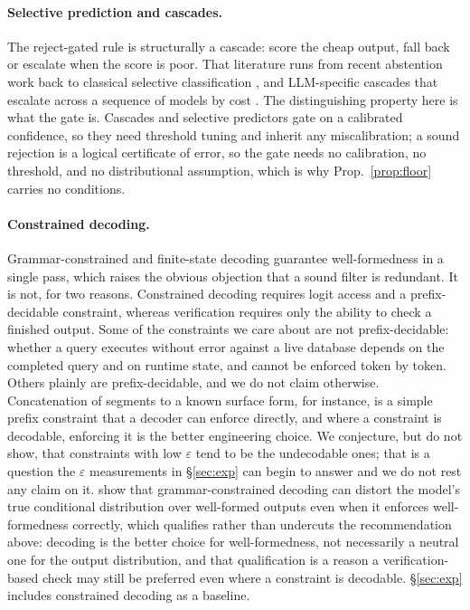 \documentclass[11pt]{article}
\begin{document}
\paragraph{Selective prediction and cascades.} The reject-gated rule is structurally a cascade: score the cheap output, fall back or escalate when the score is poor. That literature runs from recent abstention work back to classical selective classification \citep{chow1957recognition,chow1970optimum,elyaniv2010foundations,geifman2017selective}, and LLM-specific cascades that escalate across a sequence of models by cost \citep{chen2023frugalgpt}. The distinguishing property here is what the gate is. Cascades and selective predictors gate on a calibrated confidence, so they need threshold tuning and inherit any miscalibration; a sound rejection is a logical certificate of error, so the gate needs no calibration, no threshold, and no distributional assumption, which is why Prop.~\ref{prop:floor} carries no conditions.

\paragraph{Constrained decoding.} Grammar-constrained and finite-state decoding \citep{geng2023grammar,park2024grammar} guarantee well-formedness in a single pass, which raises the obvious objection that a sound filter is redundant. It is not, for two reasons. Constrained decoding requires logit access and a prefix-decidable constraint, whereas verification requires only the ability to check a finished output. Some of the constraints we care about are not prefix-decidable: whether a query executes without error against a live database depends on the completed query and on runtime state, and cannot be enforced token by token. Others plainly are prefix-decidable, and we do not claim otherwise. Concatenation of segments to a known surface form, for instance, is a simple prefix constraint that a decoder can enforce directly, and where a constraint is decodable, enforcing it is the better engineering choice. We conjecture, but do not show, that constraints with low $\varepsilon$ tend to be the undecodable ones; that is a question the $\varepsilon$ measurements in \S\ref{sec:exp} can begin to answer and we do not rest any claim on it. \citet{park2024grammar} show that grammar-constrained decoding can distort the model's true conditional distribution over well-formed outputs even when it enforces well-formedness correctly, which qualifies rather than undercuts the recommendation above: decoding is the better choice for well-formedness, not necessarily a neutral one for the output distribution, and that qualification is a reason a verification-based check may still be preferred even where a constraint is decodable. \S\ref{sec:exp} includes constrained decoding as a baseline.
\end{document}
